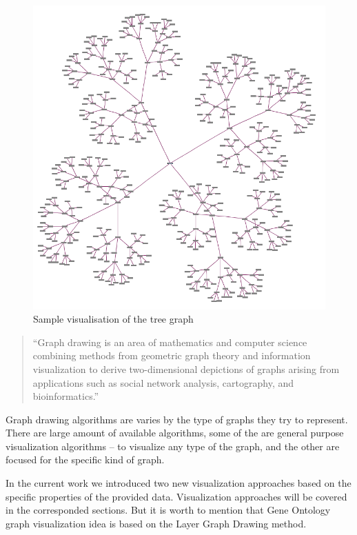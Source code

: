 \begin{figure}[h!]
\centering
\includegraphics[scale=0.3]{pictures/Tree_graph_example.png}
\caption{Sample visualisation of the tree graph}
\label{fig:tree_graph_example}
\end{figure}

\begin{quotation}
``Graph drawing is an area of mathematics and computer science combining methods from geometric graph theory and information visualization to derive two-dimensional depictions of graphs arising from applications such as social network analysis, cartography, and bioinformatics.''~\cite{Graph_drawing}
\end{quotation}

Graph drawing algorithms are varies by the type of graphs they try to represent. There are large amount of available algorithms, some of the are general purpose visualization algorithms -- to visualize any type of the graph, and the other are focused for the specific kind of graph.

In the current work we introduced two new visualization approaches based on the specific properties of the provided data. Visualization approaches will be covered in the corresponded sections. But it is worth to mention that Gene Ontology graph visualization idea is based on the Layer Graph Drawing method.

